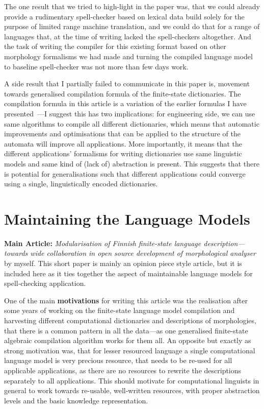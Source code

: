 \documentclass[officiallayout,draft]{unihelcompling}
\begin{document}
The one result that we tried to high-light in the paper was, that we could
already provide a rudimentary spell-checker based on lexical data build solely
for the purpose of limited range machine translation, and we could do that for
a range of languages that, at the time of writing lacked the spell-checkers
altogether. And the task of writing the compiler for this existing format
based on other morphology formalisms we had made and turning the compiled
language model to baseline spell-checker was not more than few days work.

A side result that I partially failed to communicate in this paper is, movement
towards generalised compilation formula of the finite-state dictionaries. The
compilation formula in this article is a variation of the earlier formulas I
have presented~\cite{linden2009hfst,pirinen2010compiling}---I suggest this
has two implications: for engineering side, we can use same algorithms to
compile all different dictionaries, which means that automatic improvements
and optimisations that can be applied to the structure of the automata will
improve all applications. More importantly, it means that the different
applications' formalisms for writing dictionaries use same linguistic models
and same kind of (lack of) abstraction is present. This suggests that there is
potential for generalisations such that different applications could converge
using a single, linguistically encoded dictionaries.

\section{Maintaining the Language Models}

\textbf{Main Article:} \emph{Modularisation of Finnish finite-state language 
description—towards wide collaboration in open source development of
morphological analyser} by myself. This short paper is mainly an opinion
piece style article, but it is included here as it ties together the
aspect of maintainable language models for spell-checking application.

One of the main \textbf{motivations} for writing this article was the
realisation after some years of working on the finite-state language model
compilation and harvesting different computational dictionaries and
descriptions of morphologies, that there is a common pattern in all the 
data---as one generalised finite-state algebraic compilation algorithm works
for them all. An opposite but exactly as strong motivation was, that for
lesser resourced language a single computational language model is very
precious resource, that needs to be re-used for all applicable applications,
as there are no resources to rewrite the descriptions separately to all 
applications. This should motivate for computational linguists in general to
work towards re-usable, well-written resources, with proper abstraction levels
and the basic knowledge representation.
\end{document}
